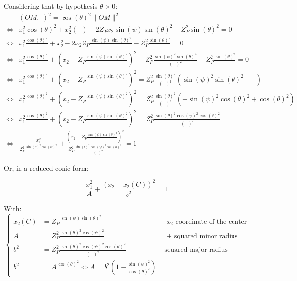 \documentclass[a4paper,11pt,twoside,titlepage,openright]{book}
\numberwithin{equation}{section}
\newcommand{\lt}{\left}
\newcommand{\rt}{\right}
\DeclareMathOperator{\ez}{\underline{e}_z}
\DeclareMathOperator{\DD}{\cos(\theta)^2 - \sin(\psi)^2}
\begin{document}
Considering that by hypothesis $\theta>0$:
$$
\begin{array}{lll}
	& (\underline{OM}.\ez)^2 = \cos(\theta)^2 \|\underline{OM}\|^2\\
	\Leftrightarrow & x_1^2\cos(\theta)^2 + x_2^2\lt(\DD\rt) - 2Z_Px_2\sin(\psi)\sin(\theta)^2 - Z_P^2\sin(\theta)^2 = 0\\
	\Leftrightarrow & x_1^2\frac{\cos(\theta)^2}{\DD} + x_2^2 - 2x_2Z_P\frac{\sin(\psi)\sin(\theta)^2}{\DD} - Z_P^2\frac{\sin(\theta)^2}{\DD} = 0\\
	\Leftrightarrow & x_1^2\frac{\cos(\theta)^2}{\DD} + \lt(x_2 - Z_P\frac{\sin(\psi)\sin(\theta)^2}{\DD}\rt)^2 - Z_P^2\frac{\sin(\psi)^2\sin(\theta)^4}{\lt(\DD\rt)^2} - Z_P^2\frac{\sin(\theta)^2}{\DD} = 0\\
	\Leftrightarrow & x_1^2\frac{\cos(\theta)^2}{\DD} + \lt(x_2 - Z_P\frac{\sin(\psi)\sin(\theta)^2}{\DD}\rt)^2 = Z_P^2 \frac{\sin(\theta)^2}{\lt(\DD\rt)^2} \lt(\sin(\psi)^2\sin(\theta)^2 + \DD \rt)\\
	\Leftrightarrow & x_1^2\frac{\cos(\theta)^2}{\DD} + \lt(x_2 - Z_P\frac{\sin(\psi)\sin(\theta)^2}{\DD}\rt)^2 = Z_P^2 \frac{\sin(\theta)^2}{\lt(\DD\rt)^2} \lt(-\sin(\psi)^2\cos(\theta)^2 + \cos(\theta)^2 \rt)\\
	\Leftrightarrow & x_1^2\frac{\cos(\theta)^2}{\DD} + \lt(x_2 - Z_P\frac{\sin(\psi)\sin(\theta)^2}{\DD}\rt)^2 = Z_P^2 \frac{\sin(\theta)^2\cos(\psi)^2\cos(\theta)^2}{\lt(\DD\rt)^2} \\
	\Leftrightarrow & \frac{x_1^2}{ Z_P^2\frac{\sin(\theta)^2\cos(\psi)^2}{\DD} } + \frac{\lt(x_2-Z_P\frac{\sin(\psi)\sin(\theta)^2}{\DD}\rt)^2}{ Z_P^2\frac{\sin(\theta)^2\cos(\psi)^2\cos(\theta)^2}{\lt(\DD\rt)^2} } = 1
\end{array}
$$

Or, in a reduced conic form:

$$
\frac{x_1^2}{ A } + \frac{\lt(x_2-x_2(C)\rt)^2}{b^2} = 1
$$


With:
$$
\lt\{
	\begin{array}{lll}
		x_2(C) & = Z_P\frac{\sin(\psi)\sin(\theta)^2}{\DD} & \text{    $x_2$ coordinate of the center} \\
		A & = Z_P^2\frac{\sin(\theta)^2\cos(\psi)^2}{\DD} & \text{  $\pm$ squared minor radius} \\
		b^2 & = Z_P^2\frac{\sin(\theta)^2\cos(\psi)^2\cos(\theta)^2}{\lt(\DD\rt)^2} & \text{    squared major radius} \\
		b^2 & = A\frac{\cos(\theta)^2}{\DD} \Leftrightarrow A = b^2\lt(1-\frac{\sin(\psi)^2}{\cos(\theta)^2}\rt)
	\end{array}
\rt.
$$
\end{document}
